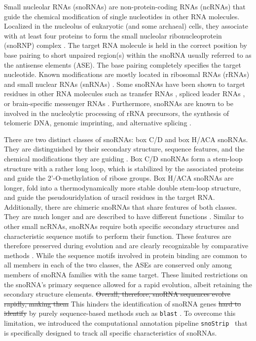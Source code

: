 \documentclass[preprint,3p,times,twocolumn]{elsarticle}
\newcommand{\PFS}[1]{\begingroup\color{green}#1\endgroup}
\newcommand{\JH}[1]{\begingroup\color{purple}#1\endgroup}
\newcommand{\sno}{snoRNA}
\newcommand{\snostrip}{\texttt{snoStrip}}
\begin{document}
Small nucleolar RNAs (snoRNAs) are non-protein-coding RNAs (ncRNAs) that
guide the chemical modification of single nucleotides in other RNA
molecules.  Localized in the nucleolus of eukaryotic (and some archaeal)
cells, they associate with at least four proteins to form the small
nucleolar ribonucleoprotein (snoRNP) complex \cite{Reichow:2007}.  The
target RNA molecule is held in the correct position by base pairing to
short unpaired region(s) within the snoRNA usually referred to as the
antisense elements (ASE). The base pairing completely specifies the target
nucleotide. Known modifications are mostly located in ribosomal RNAs
(rRNAs) and small nuclear RNAs (snRNAs)
\cite{Decatur:2002,Darzacq:2002,Bratkovi:2011}. Some snoRNAs have
been shown to target residues in other RNA molecules such as transfer RNAs
\cite{Clouet_d'Orval:2001,Dennis:2001}, spliced leader RNAs
\cite{Uliel:2004}, or brain-specific messenger RNAs \cite{Cavaillé:2000,
  Kishore:2006}. Furthermore, {\sno}s are known to be involved in the
nucleolytic processing of rRNA precursors, the synthesis of telomeric DNA,
genomic imprinting, and alternative splicing
\cite{Maxwell:1995,Tollervey:1997,Kiss:2002,Matera:2007}.

There are two distinct classes of snoRNAs: box C/D and box H/ACA snoRNAs.
They are distinguished by their secondary structure, sequence features, and
the chemical modifications they are guiding \cite{Balakin:1996,Tollervey:1997}.  Box
C/D snoRNAs form a stem-loop structure with a rather long loop, which is
stabilized by the associated proteins and guide the 2'-O-methylation of
ribose groups.  Box H/ACA snoRNAs are longer, fold into a thermodynamically
more stable double stem-loop structure, and guide the pseudouridylation of
uracil residues in the target RNA.  Additionally, there are chimeric
snoRNAs that share features of both classes. They are much longer and are
described to have different functions \cite{Darzacq:2002}. Similar to other
small ncRNAs, snoRNAs require both specific secondary structures and
characteristic sequence motifs to perform their function. These features
are therefore preserved during evolution and are clearly recognizable by
comparative methods \cite{Ganot:1997,Tollervey:1997}. While the sequence motifs
involved in protein binding are common to all members in each of
the two classes, the ASEs are conserved only among members of snoRNA
families with the same target. \JH{These limited restrictions on the snoRNA's primary sequence allowed for a rapid evolution, albeit retaining the secondary structure elements. \sout{Overall, therefore, snoRNA sequences evolve 
rapidly, making them} This hinders the identification of snoRNA genes \sout{hard to identify}} by purely sequence-based methods such
as \texttt{blast} \cite{Altschul:1990}. To overcome this limitation, we
introduced \PFS{the} computational annotation pipeline \snostrip\
\cite{Bartschat:2014} that is specifically designed to track all specific
characteristics of snoRNAs.
\end{document}
